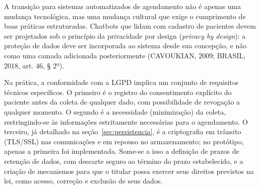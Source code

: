 \documentclass[12pt,a4paper]{extarticle}
\begin{document}
A transição para sistemas automatizados de agendamento não é apenas uma mudança tecnológica, mas uma mudança cultural que exige o cumprimento de boas práticas estruturadas. Chatbots que lidam com cadastro de pacientes devem ser projetados sob o princípio da privacidade por design (\textit{privacy by design}): a proteção de dados deve ser incorporada ao sistema desde sua concepção, e não como uma camada adicionada posteriormente (CAVOUKIAN, 2009; BRASIL, 2018, art. 46, § 2º).


Na prática, a conformidade com a LGPD implica um conjunto de requisitos técnicos específicos. O primeiro é o registro do consentimento explícito do paciente antes da coleta de qualquer dado, com possibilidade de revogação a qualquer momento. O segundo é a necessidade (minimização) da coleta, restringindo-se às informações estritamente necessárias para o agendamento. O terceiro, já detalhado na seção~\ref{sec:persistencia}, é a criptografia em trânsito (TLS/SSL) nas comunicações e em repouso no armazenamento; no protótipo, apenas a primeira foi implementada. Some-se a isso a definição de prazos de retenção de dados, com descarte seguro ao término do prazo estabelecido, e a criação de mecanismos para que o titular possa exercer seus direitos previstos na lei, como acesso, correção e exclusão de seus dados.
\end{document}
